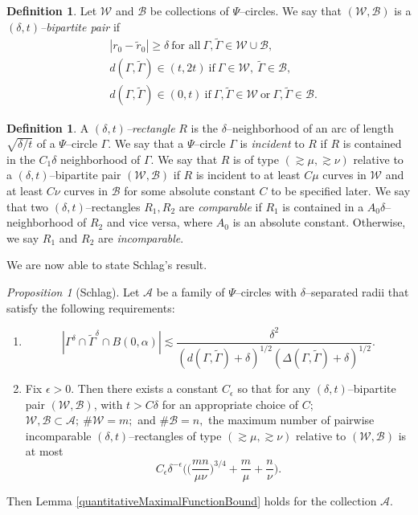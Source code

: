 \documentclass[reqno]{amsart}
\theoremstyle{definition}
\newtheorem{defn}[thm]{Definition}
\theoremstyle{remark}
\newtheorem{prop}[thm]{Proposition}
\theoremstyle{remark}
\newcommand{\itemizeEqnVSpacing}{\rule{0pt}{1pt}\vspace*{-12pt}}
\newcommand{\dt}{(\delta,t)}
\newcommand{\WC}{\mathcal W}
\newcommand{\BC}{\mathcal B}
\newcommand{\WB}{(\mathcal W,\mathcal B)}
\begin{document}
\begin{defn}\label{defnOfAtBipartitePair}
Let $\mathcal W$ and $\mathcal B$ be collections of $\Psi$--circles. We say that $\WB$ is a \emph{$\dt$--bipartite pair} if
\begin{align}
&|r_0-\tilde r_0|\geq\delta\ \textrm{for all}\ \Gamma,\tilde\Gamma\in\WC\cup\BC,\\
&d(\Gamma,\tilde\Gamma)\in (t,2t)\ \textrm{if}\ \Gamma\in \WC,\ \tilde\Gamma\in\BC,\\
&d(\Gamma,\tilde\Gamma)\in (0,t)\ \textrm{if}\ \Gamma,\tilde\Gamma\in \WC\ \textrm{or}\ \Gamma,\tilde\Gamma\in \BC.
\end{align}
\end{defn}
%
\begin{defn}\label{defnOfARectangle}
A \emph{$\dt$--rectangle} $R$ is the $\delta$--neighborhood of an arc of length $\sqrt{\delta/t}$ of a $\Psi$--circle $\Gamma$. We say that a $\Psi$--circle $\Gamma$ is \emph{incident} to $R$ if $R$ is contained in the $C_1\delta$ neighborhood of $\Gamma$. We say that $R$ is of type $(\gtrsim\mu,\gtrsim\nu)$ relative to a $\dt$--bipartite pair $\WB$ if $R$ is incident to at least $C\mu$ curves in $\mathcal W$ and at least $C\nu$ curves in $\mathcal B$ for some absolute constant $C$ to be specified later. We say that two $\dt$--rectangles $R_1,R_2$ are \emph{comparable} if $R_1$ is contained in a $A_0\delta$--neighborhood of $R_2$ and vice versa, where $A_0$ is an absolute constant. Otherwise, we say $R_1$ and $R_2$ are \emph{incomparable}.
\end{defn}
%
We are now able to state Schlag's result.
%
\begin{prop}[Schlag]\label{schlagsThm}
Let $\mathcal A$ be a family of $\Psi$--circles with $\delta$--separated radii that satisfy the following requirements:
\begin{enumerate}[label=(\roman{*}), ref=(\roman{*})]
\item\label{schlagThmItemOne}\itemizeEqnVSpacing
\begin{equation}\label{schlagThmControlOfIntersectionSize}
|\Gamma^\delta\cap \tilde \Gamma^\delta\cap B(0,\alpha)|\lesssim\frac{\delta^2}{(d(\Gamma,\tilde\Gamma)+\delta)^{1/2}(\Delta(\Gamma,\tilde\Gamma)+\delta)^{1/2}}.
\end{equation}
%
\item\label{schlagThmItemTwo} Fix $\epsilon>0.$ Then there exists a constant $C_\epsilon$ so that for any $\dt$--bipartite pair $\WB$, with $t>C\delta$ for an appropriate choice of $C$; $\WC,\BC\subset\mathcal A;\ \#\WC=m;$ and $\#\BC=n,$ the maximum number of pairwise incomparable $\dt$--rectangles of type $(\gtrsim\mu,\gtrsim\nu)$ relative to $\WB$ is at most
\begin{equation}\label{schlagThmNumberIncidencesControl}
C_\epsilon\delta^{-\epsilon}\Big(\Big(\frac{mn}{\mu\nu}\Big)^{3/4}+\frac{m}{\mu}+\frac{n}{\nu}\Big).
\end{equation}
\end{enumerate}
Then Lemma \ref{quantitativeMaximalFunctionBound} holds for the collection $\mathcal A$.
\end{prop}
\end{document}
